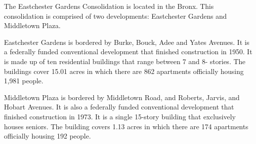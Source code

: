 

The Eastchester Gardens Consolidation is located in the Bronx. This consolidation is comprised of two developments: Eastchester Gardens and Middletown Plaza.

Eastchester Gardens is bordered by Burke, Bouck, Adee and Yates Avenues.  It is a federally funded conventional development that finished construction in 1950. It is made up of ten residential buildings that range between 7 and 8- stories. The buildings cover 15.01 acres in which there are 862 apartments officially housing 1,981 people.   

  

Middletown Plaza is bordered by Middletown Road, and Roberts, Jarvis, and Hobart Avenues. It is also a federally funded conventional development that finished construction in 1973. It is a single 15-story building that exclusively houses seniors. The building covers 1.13 acres in which there are 174 apartments officially housing 192 people.
